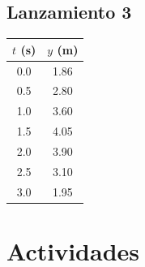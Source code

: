 \documentclass[12pt]{article}
\begin{document}
\subsection*{Lanzamiento 3}
\begin{center}
\begin{tabular}{cc}
\toprule
$t$ (s) & $y$ (m) \\
\midrule
0.0 & 1.86 \\
0.5 & 2.80 \\
1.0 & 3.60 \\
1.5 & 4.05 \\
2.0 & 3.90 \\
2.5 & 3.10 \\
3.0 & 1.95 \\
\bottomrule
\end{tabular}
\end{center}

\section*{Actividades}
\end{document}
